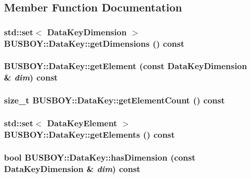 \subsection{Member Function Documentation}
\hypertarget{classBUSBOY_1_1DataKey_a7a2e1751943d5cdaf77dadda9fe73dc9}{
\subsubsection[{getDimensions}]{\setlength{\rightskip}{0pt plus 5cm}std::set$<$ {\bf DataKeyDimension} $>$ BUSBOY::DataKey::getDimensions () const}}
\label{classBUSBOY_1_1DataKey_a7a2e1751943d5cdaf77dadda9fe73dc9}
\hypertarget{classBUSBOY_1_1DataKey_a02a769f2f6549998b94e521127975e0a}{
\subsubsection[{getElement}]{ BUSBOY::DataKey::getElement (const {\bf DataKeyDimension} \& {\em dim}) const}}
\label{classBUSBOY_1_1DataKey_a02a769f2f6549998b94e521127975e0a}
\hypertarget{classBUSBOY_1_1DataKey_a6f07dc15b1bc3bca93f0178c38ba7556}{
\subsubsection[{getElementCount}]{\setlength{\rightskip}{0pt plus 5cm}size\_\-t BUSBOY::DataKey::getElementCount () const}}
\label{classBUSBOY_1_1DataKey_a6f07dc15b1bc3bca93f0178c38ba7556}
\hypertarget{classBUSBOY_1_1DataKey_a6d0ecaa668b9f8163f0f52216db10a3a}{
\subsubsection[{getElements}]{\setlength{\rightskip}{0pt plus 5cm}std::set$<$ {\bf DataKeyElement} $>$ BUSBOY::DataKey::getElements () const}}
\label{classBUSBOY_1_1DataKey_a6d0ecaa668b9f8163f0f52216db10a3a}
\hypertarget{classBUSBOY_1_1DataKey_a8fcf134470530a671a2cb7d672bc9aed}{
\subsubsection[{hasDimension}]{\setlength{\rightskip}{0pt plus 5cm}bool BUSBOY::DataKey::hasDimension (const {\bf DataKeyDimension} \& {\em dim}) const}}
